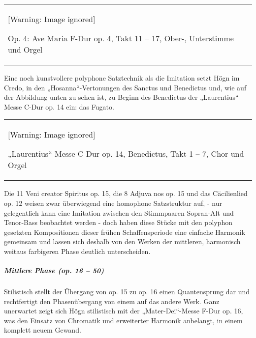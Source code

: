 \begin{center}
\tablefirsthead{}
\tablehead{}
\tabletail{}
\tablelasttail{}
\begin{supertabular}{m{11.565001cm}}
  [Warning: Image ignored] %

Op. 4: Ave Maria F-Dur op. 4, Takt 11 –
17, Ober-, Unterstimme und Orgel\\
\end{supertabular}
\end{center}
Eine noch kunstvollere polyphone Satztechnik als die Imitation setzt
Högn im Credo, in den „Hosanna“-Vertonungen des Sanctus und Benedictus
und, wie auf der Abbildung unten zu sehen ist, zu Beginn des Benedictus
der „Laurentius“-Messe C-Dur op. 14 ein: das Fugato.

\begin{center}
\tablefirsthead{}
\tablehead{}
\tabletail{}
\tablelasttail{}
\begin{supertabular}{m{11.948cm}}
  [Warning: Image ignored] %

„Laurentius“-Messe C-Dur op. 14,
Benedictus, Takt 1 – 7, Chor und Orgel\\
\end{supertabular}
\end{center}
Die 11 Veni creator Spiritus op. 15, die 8 Adjuva nos op. 15 und das
Cäcilienlied op. 12 weisen zwar überwiegend eine homophone Satzstruktur
auf, - nur gelegentlich kann eine Imitation zwischen den Stimmpaaren
Sopran-Alt und Tenor-Bass beobachtet werden - doch haben diese Stücke
mit den polyphon gesetzten Kompositionen dieser frühen Schaffensperiode
eine einfache Harmonik gemeinsam und lassen sich deshalb von den Werken
der mittleren, harmonisch weitaus farbigeren Phase deutlich
unterscheiden.

\subparagraph{Mittlere Phase (op. 16 – 50)}
Stilistisch stellt der Übergang von op. 15 zu op. 16 einen Quantensprung
dar und rechtfertigt den Phasenübergang von einem auf das andere Werk.
Ganz unerwartet zeigt sich Högn stilistisch mit der „Mater-Dei“-Messe
F-Dur op. 16, was den Einsatz von Chromatik und erweiterter Harmonik
anbelangt, in einem komplett neuem Gewand.


